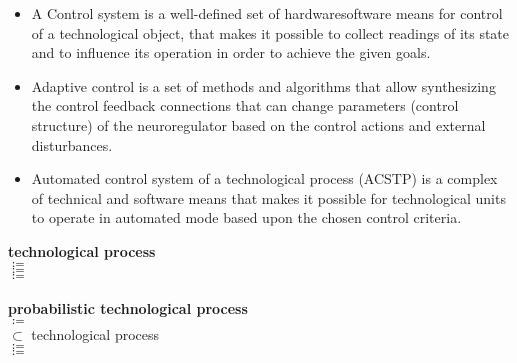 \documentclass{article}
\begin{document}
\newpage
\begin{multicols}{2}
\begin{itemize}
    \renewcommand{\labelitemi}{ 5)}
    \item A Control system is a well-defined set of hardwaresoftware means for control of a technological object, that makes it possible to collect readings of its state and to influence its operation in order to achieve the given goals.
    \renewcommand{\labelitemi}{6)}
    \item  Adaptive control is a set of methods and algorithms that allow synthesizing the control feedback connections that can change parameters (control structure) of the neuroregulator based on the control actions and external disturbances.
    \renewcommand{\labelitemi}{7)}
    \item Automated control system of a technological process (ACSTP) is a complex of technical and software means that makes it possible for technological units to operate in automated mode based upon the chosen control criteria.\\
\end{itemize}
\textbf{technological process}\\
\(\coloneqq\)  \\
\(\coloneqq\)  \\
\(\coloneqq\) \quad [a set of technological operations \(\{TCO_i_j\}\), where \par\quad i, j = \(\overline{1, N,}\) as well as the resources consumed by \par\quad those operations] \\ \\
\textbf{probabilistic technological process}\\
\(\coloneqq\) \quad[PTP] \\
\(\subset\) \quad technological process\\
\(\coloneqq\) \\
\(\coloneqq\)  \\ \\

\end{multicols}
\end{document}
